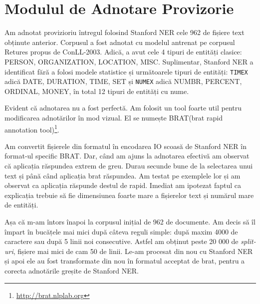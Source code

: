 
\section{Modulul de Adnotare Provizorie}

Am adnotat provizioriu întregul folosind Stanford NER cele 962 de fișiere text obținute anterior. Corpusul a fost adnotat cu modelul antrenat pe corpusul Retures propus de ConLL-2003. Adică, a avut cele 4 tipuri de entități clasice: PERSON, ORGANIZATION, LOCATION, MISC. Suplimentar, Stanford NER a identificat fără a folosi modele statistice și următoarele tipuri de entități: \texttt{TIMEX} adică DATE, DURATION, TIME, SET și \texttt{NUMEX} adică NUMBR, PERCENT, ORDINAL, MONEY, în total 12 tipuri de entități cu nume.

Evident că adnotarea nu a fost perfectă. Am folosit un tool foarte util pentru modificarea adnotărilor în mod vizual. El se numește BRAT(brat rapid annotation tool)\footnote{\url{http://brat.nlplab.org}}.

Am convertit fișierele din formatul în encodarea IO scoasă de Stanford NER în format-ul specific BRAT. Dar, când am ajuns la adnotarea efectivă am observat că aplicația răspundea extrem de greu. Durau secunde bune de la selectarea unui text și până când aplicația brat răspundea. Am testat pe exemplele lor și am observat ca aplicația răspunde destul de rapid. Imediat am ipotezat faptul ca explicația trebuie să fie dimensiunea foarte mare a fișierelor text și numărul mare de entități.

Așa că m-am întors înapoi la corpusul inițial de 962 de documente. Am decis să îl împart în bucățele mai mici după câteva reguli simple: după maxim 4000 de caractere sau după 5 linii noi consecutive. Astfel am obținut peste 20 000 de \textit{split-uri}, fișiere mai mici de cam 50 de linii. Le-am procesat din nou cu Stanford NER și apoi ele au fost transformate din nou în formatul acceptat de brat, pentru a corecta adnotările greșite de Stanford NER.























